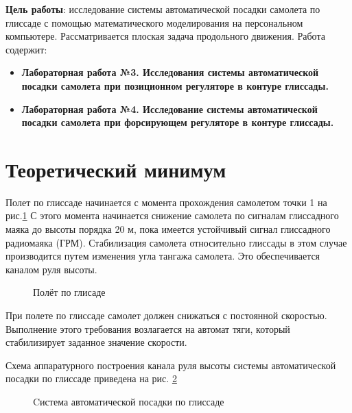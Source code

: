 

\textbf{Цель работы}: исследование системы автоматической посадки самолета по глиссаде с помощью математического моделирования на персональном компьютере. Рассматривается плоская задача продольного движения. Работа содержит:
\begin{itemize}
    \item \textbf{Лабораторная работа №3. Исследования системы автоматической посадки самолета при позиционном регуляторе в контуре глиссады.}
    \item \textbf{Лабораторная работа №4. Исследование системы автоматической посадки самолета при форсирующем регуляторе в контуре глиссады.}
\end{itemize}

\section{Теоретический минимум}

Полет по глиссаде начинается с момента прохождения самолетом  точки 1 на рис.\ref{fig:Полёт по глисаде} С этого момента начинается снижение самолета по сигналам глиссадного маяка до высоты порядка 20 м, пока имеется устойчивый сигнал глиссадного радиомаяка (ГРМ). Стабилизация самолета относительно глиссады в этом случае производится путем изменения угла тангажа самолета. Это обеспечивается каналом руля высоты.

\begin{figure}[H]
    \caption{Полёт по глисаде}
    \label{fig:Полёт по глисаде}
\end{figure}

При полете по глиссаде самолет должен снижаться с постоянной скоростью. Выполнение этого требования возлагается на автомат тяги, который стабилизирует заданное значение скорости.

Схема аппаратурного построения канала руля высоты системы автоматической посадки по глиссаде приведена на рис. \ref{fig:Cистема автоматической посадки по глиссаде}

\begin{figure}[H]
    \caption{Cистема автоматической посадки по глиссаде}
    \label{fig:Cистема автоматической посадки по глиссаде}
\end{figure}

